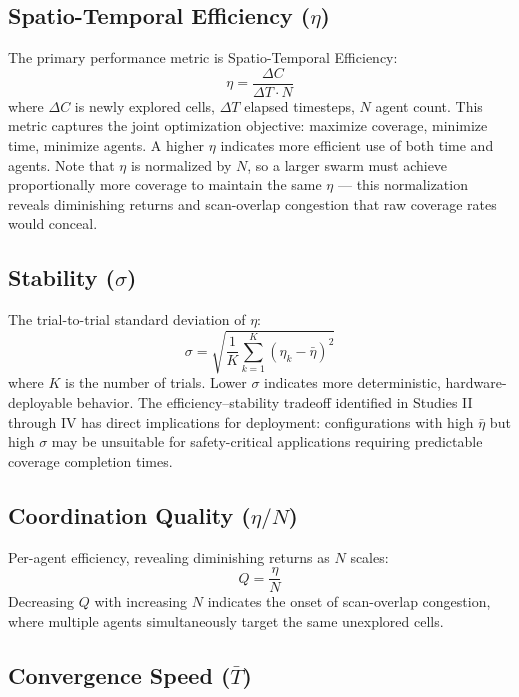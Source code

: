 \documentclass[journal,compsoc]{IEEEtran}
\begin{document}
\subsection{Spatio-Temporal Efficiency ($\eta$)}

The primary performance metric is Spatio-Temporal Efficiency:
\begin{equation}
    \eta = \frac{\Delta C}{\Delta T \cdot N}
    \label{eq:eta}
\end{equation}
where $\Delta C$ is newly explored cells, $\Delta T$ elapsed timesteps, $N$ agent count.
This metric captures the joint optimization objective: maximize coverage, minimize time,
minimize agents. A higher $\eta$ indicates more efficient use of both time and agents.
Note that $\eta$ is normalized by $N$, so a larger swarm must achieve proportionally
more coverage to maintain the same $\eta$ --- this normalization reveals diminishing
returns and scan-overlap congestion that raw coverage rates would conceal.

\subsection{Stability ($\sigma$)}

The trial-to-trial standard deviation of $\eta$:
\begin{equation}
    \sigma = \sqrt{\frac{1}{K}\sum_{k=1}^{K}(\eta_k - \bar{\eta})^2}
\end{equation}
where $K$ is the number of trials. Lower $\sigma$ indicates more deterministic,
hardware-deployable behavior. The efficiency--stability tradeoff identified in Studies
II through IV has direct implications for deployment: configurations with high
$\bar{\eta}$ but high $\sigma$ may be unsuitable for safety-critical applications
requiring predictable coverage completion times.

\subsection{Coordination Quality ($\eta/N$)}

Per-agent efficiency, revealing diminishing returns as $N$ scales:
\begin{equation}
    Q = \frac{\eta}{N}
\end{equation}
Decreasing $Q$ with increasing $N$ indicates the onset of scan-overlap congestion,
where multiple agents simultaneously target the same unexplored cells.

\subsection{Convergence Speed ($\bar{T}$)}
\end{document}

